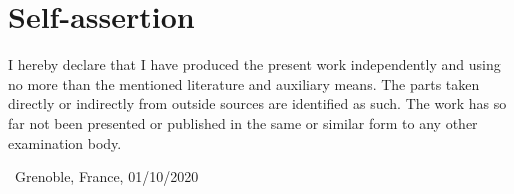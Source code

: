 \chapter*{Self-assertion}
\label{sec:declaration}
\thispagestyle{empty}
\vspace*{\fill}
\noindent
I hereby declare that I have produced the present work independently and using no more than the mentioned literature and auxiliary means. The parts taken directly or indirectly from outside sources are identified as such. The work has so far not been presented or published in the same or similar form to any other examination body.

\smallskip


\noindent\ {Grenoble, France, 01/10/2020}

\smallskip

\begin{flushright}
	\begin{minipage}{5cm}
		\centering\thesisName
	\end{minipage}
\end{flushright}
\vspace*{\fill}

